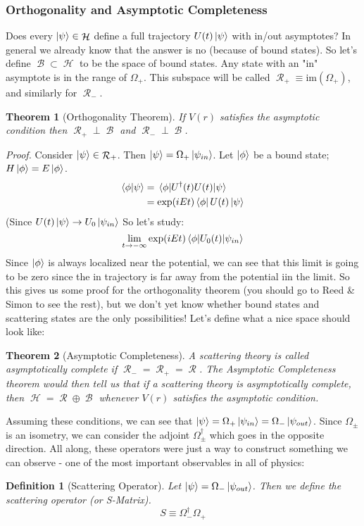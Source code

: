 \documentclass{article}
\DeclareMathOperator{\Bb}{\mathcal{B}}
\DeclareMathOperator{\Hh}{{\mathcal{H}}}
\DeclareMathOperator{\Rr}{{\mathcal{R}}}
\newtheorem{defn}{Definition}
\newtheorem{thm}{Theorem}
\begin{document}
\subsubsection{Orthogonality and Asymptotic Completeness}
Does every $\ket{\psi} \in \Hh$ define a full trajectory $U(t)\ket{\psi}$ with in/out asymptotes? In general we already know that the answer is no (because of bound states). So let's define $\Bb \subset \Hh$ to be the space of bound states. Any state with an "in" asymptote is in the range of $\Omega_+$. This subspace will be called $\Rr_+ \equiv \textrm{im}(\Omega_+)$, and similarly for $\Rr_-$.
\begin{thm}[Orthogonality Theorem] If $V(r)$ satisfies the asymptotic condition then $\Rr_+ \perp \Bb$ and $\Rr_- \perp \Bb$.
\end{thm}
\textit{Proof.} Consider $\ket{\psi}\in \Rr_+$. Then $\ket{\psi}=\Omega_+ \ket{\psi_{in}}$. Let $\ket{\phi}$ be a bound state; $H\ket{\phi}=E\ket{\phi}$.
\begin{align}
\braket{\phi}{\psi}&=\mel{\phi}{U^\dagger(t) U(t)}{\psi}\\
&= \exp(iEt)\bra{\phi}U(t)\ket{\psi}\\
\end{align}
(Since $U(t)\ket{\psi}\to U_0\ket{\psi_{in}}$ So let's study:
\[\lim_{t\to-\infty}\exp(iEt)\mel{\phi}{U_0(t)}{\psi_{in}}\]
Since $\ket{\phi}$ is always localized near the potential, we can see that this limit is going to be zero since the in trajectory is far away from the potential iin the limit. So this gives us some proof for the orthogonality theorem (you should go to Reed \& Simon to see the rest), but we don't yet know whether bound states and scattering states are the only possibilities! Let's define what a nice space should look like:
\begin{thm}[Asymptotic Completeness]
A scattering theory is called asymptotically complete if $\Rr_-=\Rr_+ = \Rr$. The Asymptotic Completeness theorem would then tell us that if a scattering theory is asymptotically complete, then $\Hh=\Rr\oplus \Bb$ whenever $V(r)$ satisfies the asymptotic condition. 
\end{thm}
Assuming these conditions, we can see that $\ket{\psi} = \Omega_+ \ket{\psi_{in}} = \Omega_- \ket{\psi_{out}}$. Since $\Omega_\pm$ is an isometry, we can consider the adjoint $\Omega_\pm^\dagger$ which goes in the opposite direction. All along, these operators were just a way to construct something we can observe - one of the most important observables in all of physics:
\begin{defn}[Scattering Operator] Let $\ket{\psi}=\Omega_-\ket{\psi_{out}}$. Then we define the scattering operator (or S-Matrix).
\begin{equation}S \equiv \Omega_-^\dagger \Omega_+\end{equation}
\end{defn}
\end{document}
